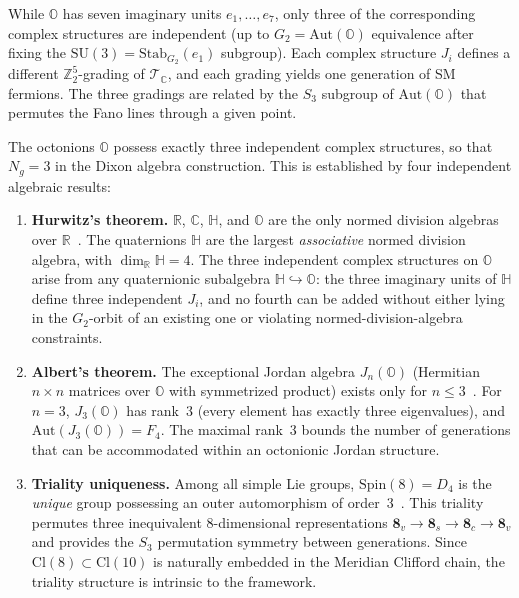While $\mathbb{O}$ has seven imaginary units $e_1, \ldots, e_7$, only three of the corresponding complex structures are independent (up to $G_2 = \mathrm{Aut}(\mathbb{O})$ equivalence after fixing the $\mathrm{SU}(3) = \mathrm{Stab}_{G_2}(e_1)$ subgroup). Each complex structure $J_i$ defines a different $\mathbb{Z}_2^5$-grading of $\mathcal{T}_{\mathbb{C}}$, and each grading yields one generation of SM fermions. The three gradings are related by the $S_3$ subgroup of $\mathrm{Aut}(\mathbb{O})$ that permutes the Fano lines through a given point.

\begin{theorem}[Algebraic Rigidity of $N_g = 3$]\label{thm:4-3}
The octonions $\mathbb{O}$ possess exactly three independent complex structures, so that $N_g = 3$ in the Dixon algebra construction. This is established by four independent algebraic results:

\begin{enumerate}
  \item \textbf{Hurwitz's theorem.} $\mathbb{R}$, $\mathbb{C}$, $\mathbb{H}$, and $\mathbb{O}$ are the only normed division algebras over $\mathbb{R}$~\cite{ch4:Hurwitz1898}. The quaternions $\mathbb{H}$ are the largest \emph{associative} normed division algebra, with $\dim_{\mathbb{R}} \mathbb{H} = 4$. The three independent complex structures on $\mathbb{O}$ arise from any quaternionic subalgebra $\mathbb{H} \hookrightarrow \mathbb{O}$: the three imaginary units of $\mathbb{H}$ define three independent $J_i$, and no fourth can be added without either lying in the $G_2$-orbit of an existing one or violating normed-division-algebra constraints.

  \item \textbf{Albert's theorem.} The exceptional Jordan algebra $J_n(\mathbb{O})$ (Hermitian $n \times n$ matrices over $\mathbb{O}$ with symmetrized product) exists only for $n \leq 3$~\cite{ch4:Albert1934,ch4:TodorovDV2018}. For $n = 3$, $J_3(\mathbb{O})$ has rank~3 (every element has exactly three eigenvalues), and $\mathrm{Aut}(J_3(\mathbb{O})) = F_4$. The maximal rank~3 bounds the number of generations that can be accommodated within an octonionic Jordan structure.

  \item \textbf{Triality uniqueness.} Among all simple Lie groups, $\mathrm{Spin}(8) = D_4$ is the \emph{unique} group possessing an outer automorphism of order~3~\cite{ch4:Baez2002}. This triality permutes three inequivalent 8-dimensional representations $\mathbf{8}_v \to \mathbf{8}_s \to \mathbf{8}_c \to \mathbf{8}_v$ and provides the $S_3$ permutation symmetry between generations. Since $\mathrm{Cl}(8) \subset \mathrm{Cl}(10)$ is naturally embedded in the Meridian Clifford chain, the triality structure is intrinsic to the framework.


\end{enumerate}
\end{theorem}
